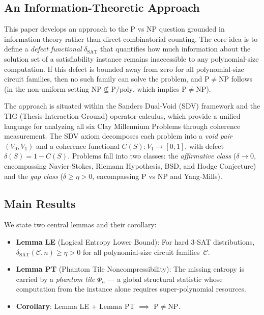 \documentclass[11pt]{article}
\theoremstyle{definition}
\theoremstyle{remark}
\newcommand{\calC}{\mathcal{C}}
\newcommand{\Ppoly}{\mathrm{P/poly}}
\newcommand{\dSAT}{\delta_{\mathrm{SAT}}}
\begin{document}
\subsection{An Information-Theoretic Approach}

This paper develops an approach to the P vs NP question grounded in
information theory rather than direct combinatorial counting.  The
core idea is to define a \emph{defect functional} $\dSAT$ that quantifies
how much information about the solution set of a satisfiability instance
remains inaccessible to any polynomial-size computation.  If this defect
is bounded away from zero for all polynomial-size circuit families, then
no such family can solve the problem, and $\mathrm{P} \neq \mathrm{NP}$
follows (in the non-uniform setting $\mathrm{NP} \not\subseteq \Ppoly$,
which implies $\mathrm{P} \neq \mathrm{NP}$).

The approach is situated within the Sanders Dual-Void (SDV) framework
and the TIG (Thesis-Interaction-Ground) operator calculus, which provide
a unified language for analyzing all six Clay Millennium Problems through
coherence measurement.  The SDV axiom decomposes each problem into a
\emph{void pair} $(V_0, V_1)$ and a coherence functional $C(S): V_1 \to [0,1]$,
with defect $\delta(S) = 1 - C(S)$.  Problems fall into two classes:
the \emph{affirmative class} ($\delta \to 0$, encompassing Navier-Stokes,
Riemann Hypothesis, BSD, and Hodge Conjecture) and the \emph{gap class}
($\delta \geq \eta > 0$, encompassing P vs NP and Yang-Mills).

\subsection{Main Results}

We state two central lemmas and their corollary:

\begin{itemize}
  \item \textbf{Lemma LE} (Logical Entropy Lower Bound): For hard 3-SAT
    distributions, $\dSAT(\calC, n) \geq \eta > 0$ for all polynomial-size
    circuit families~$\calC$.

  \item \textbf{Lemma PT} (Phantom Tile Noncompressibility): The missing
    entropy is carried by a \emph{phantom tile} $\Phi_n$ --- a global
    structural statistic whose computation from the instance alone requires
    super-polynomial resources.

  \item \textbf{Corollary}: Lemma LE + Lemma PT $\implies$ $\mathrm{P} \neq \mathrm{NP}$.
\end{itemize}
\end{document}
